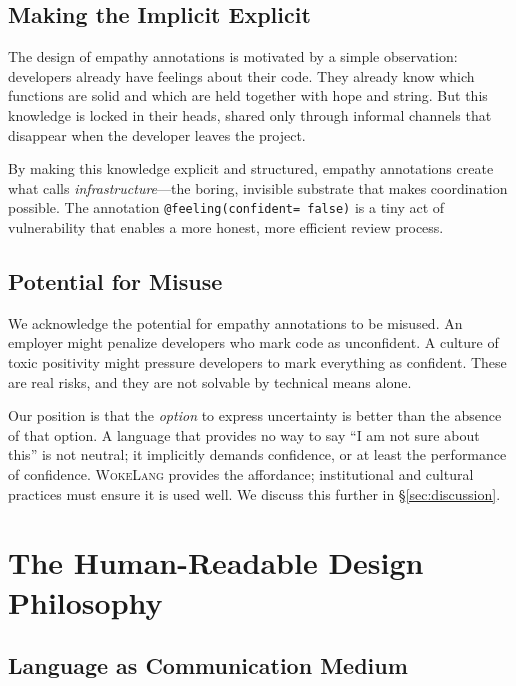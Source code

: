 \documentclass[11pt,a4paper]{article}
\newcommand{\WokeLang}{\textsc{WokeLang}}
\begin{document}
\subsection{Making the Implicit Explicit}

The design of empathy annotations is motivated by a simple
observation: developers already have feelings about their code.  They
already know which functions are solid and which are held together with
hope and string.  But this knowledge is locked in their heads, shared
only through informal channels that disappear when the developer
leaves the project.

By making this knowledge explicit and structured, empathy annotations
create what \citet{star1999ethnography} calls
\emph{infrastructure}---the boring, invisible substrate that makes
coordination possible.  The annotation \texttt{@feeling(confident=%
false)} is a tiny act of vulnerability that enables a more honest,
more efficient review process.

\subsection{Potential for Misuse}

We acknowledge the potential for empathy annotations to be misused.
An employer might penalize developers who mark code as unconfident.  A
culture of toxic positivity might pressure developers to mark
everything as confident.  These are real risks, and they are not
solvable by technical means alone.

Our position is that the \emph{option} to express uncertainty is
better than the absence of that option.  A language that provides no
way to say ``I am not sure about this'' is not neutral; it implicitly
demands confidence, or at least the performance of confidence.
\WokeLang{} provides the affordance; institutional and cultural
practices must ensure it is used well.  We discuss this further in
\S\ref{sec:discussion}.

\section{The Human-Readable Design Philosophy}
\label{sec:philosophy}

\subsection{Language as Communication Medium}
\end{document}
